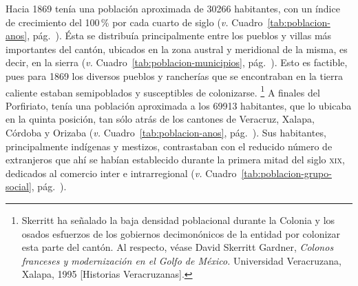 \documentclass[14pt,twoside,final]{extbook} %
\let\oldfootnote\footnote
\renewcommand\footnote[1]{%
\oldfootnote{\hspace{1mm}#1}}
\begin{document}
Hacia 1869 tenía una población aproximada de 30266 habitantes, con un índice de crecimiento del 100\,\% por cada cuarto de siglo (\emph{v.} Cuadro~\ref{tab:poblacion-anos}, pág.~\pageref{tab:poblacion-anos}). Ésta se distribuía principalmente entre los pueblos y villas más importantes del cantón, ubicados en la zona austral y meridional de la misma, es decir, en la sierra (\emph{v.} Cuadro~\ref{tab:poblacion-municipios}, pág.~\pageref{tab:poblacion-municipios}). Esto es factible, pues para 1869 los diversos pueblos y rancherías que se encontraban en la tierra caliente estaban semipoblados y susceptibles de colonizarse.\footnote{Skerritt ha señalado la baja densidad poblacional durante la Colonia y los osados esfuerzos de los gobiernos decimonónicos de la entidad por colonizar esta parte del cantón. Al respecto, véase David Skerritt Gardner, \emph{Colonos franceses y modernización en el Golfo de México.} Universidad Veracruzana, Xalapa, 1995 [Historias Veracruzanas].} A finales del Porfiriato, tenía una población aproximada a los 69913 habitantes, que lo ubicaba en la quinta posición, tan sólo atrás de los cantones de Veracruz, Xalapa, Córdoba y Orizaba (\emph{v.} Cuadro~\ref{tab:poblacion-anos}, pág.~\pageref{tab:poblacion-anos}). Sus habitantes, principalmente indígenas y mestizos, contrastaban con el reducido número de extranjeros que ahí se habían establecido durante la primera mitad del siglo \textsc{xix}, dedicados al comercio inter e intrarregional (\emph{v.} Cuadro~\ref{tab:poblacion-grupo-social}, pág.~\pageref{tab:poblacion-grupo-social}).
\end{document}
